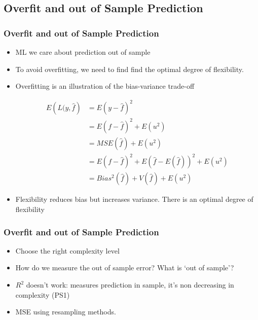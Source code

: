 \documentclass[
  shownotes,
  xcolor={svgnames},
  hyperref={colorlinks,citecolor=DarkBlue,linkcolor=DarkRed,urlcolor=DarkBlue}
  , aspectratio=169]{beamer}
\begin{document}
\subsection{Overfit and out of Sample Prediction}
\begin{frame}[fragile]
\frametitle{Overfit and out of Sample Prediction}


\begin{itemize}
  \item ML we care about prediction out of sample
  \medskip

  \item To avoid overfitting, we need to find find the optimal degree of flexibility.
\medskip
  \item Overfitting is an illustration of the bias-variance trade-off 


\begin{align}
E \left(L(y,\hat{f} \right)  &= E(y-\hat f)^2  \\
                 &= E(f-\hat{f})^2 + E(u^2) \\
                 &=  MSE(\hat f) + E(u^2) \\
                 &=  E(f-\hat f)^2 +E(\hat f-E(\hat f))^2+ E(u^2) \\
                 &= Bias^2(\hat f) + V(\hat f) + E(u^2)
\end{align}

\item Flexibility reduces bias but increases variance. There is an optimal degree of flexibility
  \end{itemize}
\end{frame}
\begin{frame}[fragile]
\frametitle{Overfit and out of Sample Prediction}


\begin{itemize}

  \medskip
  \item Choose the right complexity level
  \medskip
  \item How do we measure the out of sample error? What is `out of sample'?
  \medskip
  \item $R^2$ doesn't work: measures prediction in sample, it's non decreasing in complexity (PS1)
  \pause
  \medskip
  \item MSE using resampling methods.
\end{itemize}

\end{frame}
\end{document}
